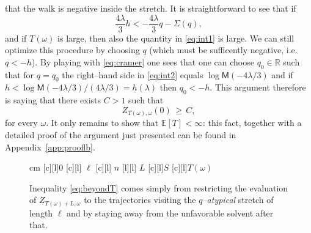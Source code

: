 \documentclass[reqno,11pt]{amsart}
\numberwithin{equation}{section}
\newcommand{\R}{\mathbb{R}}
\newcommand{\bbE}{{\ensuremath{\mathbb E}} }
\newcommand{\go}{\omega}
\newcommand{\gl}{\lambda}
\newcommand{\M}{\textsf{M}}
\begin{document}
that the walk is negative inside the stretch.
It is straightforward to see that if
\begin{equation}
\label{eq:int2}
\frac {4\gl} 3 h < -\frac {4\gl} 3 q -  \Sigma(q),
 \end{equation}
and if $T(\go)$ is large, then also  the quantity in
 \eqref{eq:int1} is large. We can still optimize this procedure by choosing $q$ (which must be sufficently negative, i.e. $q < -h$).
 By playing with
\eqref{eq:cramer}
one sees that one can choose $q_0\in \R$ such that for $q=q_0$ the right--hand side
in \eqref{eq:int2} equals $\log \M (-4\gl/3)$ and
if $h<\log \M (-4\gl/3)/(4\gl/3) = \underline{h} (\gl)$
 then $q_0 <-h$. This argument therefore is saying that there
 exists $C>1$ such that
 \begin{equation}
 \label{eq:C1}
 Z_{T(\go), \go}(0) \, \ge \, C,
\end{equation}
for every $\go$. It only remains to show that $\bbE[T]<\infty$: this fact, together with a detailed proof of the argument just presented can be found in Appendix~\ref{app:prooflb}.



\medskip

\begin{figure}[h]
\begin{center}
\leavevmode
{} cm
\psfragscanon
{}[c][l]{$0$}
[c][l]{ $\ell$}
[c][l]{ $n$}
[l][l]{ $L$}
[c][l]{$S$}
[c][l]{$T(\go)$}
\end{center}
\caption{\label{fig:ZT}
Inequality \eqref{eq:beyondT}
comes simply from restricting the evaluation of $Z_{T(\go) +L, \go} $ to the trajectories
visiting the {\sl $q$--atypical} stretch of length $\ell$  and by staying away from
the unfavorable solvent after that.
}
\end{figure}
\end{document}
